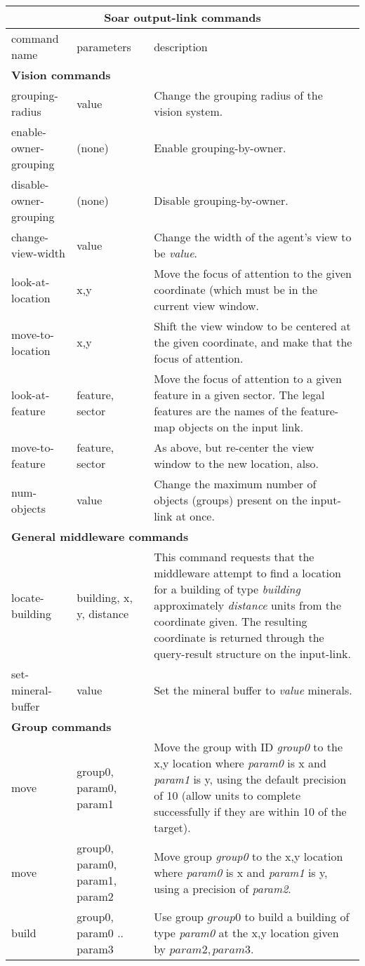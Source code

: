 \begin{center}
\begin{tabular}{|l|l|p{3.5in}|}
\hline
\multicolumn{3}{|c|}{\textbf{Soar output-link commands}}\\ 
\hline
command name &  parameters & description \\
\hline \hline
\multicolumn{3}{|l|}{\textbf{Vision commands}}\\ 
\hline
grouping-radius & value & Change the grouping radius of the vision system. \\
\hline
enable-owner-grouping & (none) & Enable grouping-by-owner.\\
\hline
disable-owner-grouping & (none) & Disable grouping-by-owner.\\
\hline
change-view-width & value & Change the width of the agent's view to be \textit{value}.\\
\hline 
look-at-location & x,y & Move the focus of attention to the given coordinate (which must be in the current view window.\\
\hline
move-to-location & x,y & Shift the view window to be centered at the given coordinate, and make that the focus of attention. \\
\hline
look-at-feature & feature, sector & Move the focus of attention to a given feature in a given sector. The legal features are the names of the feature-map objects on the input link.\\
\hline
move-to-feature & feature, sector & As above, but re-center the view window to the new location, also.\\
\hline
num-objects & value & Change the maximum number of objects (groups) present on the input-link at once.\\
\hline
\multicolumn{3}{|l|}{\textbf{General middleware commands}}\\ 
\hline
locate-building & building, x, y, distance & This command requests that the middleware attempt to find a location for a building of type \textit{building} approximately \textit{distance} units from the coordinate given. The resulting coordinate is returned through the query-result structure on the input-link. \\
\hline
set-mineral-buffer & value & Set the mineral buffer to \textit{value} minerals.\\
\hline
\multicolumn{3}{|l|}{\textbf{Group commands}}\\
\hline
move & group0, param0, param1 & Move the group with ID \textit{group0} to the x,y location where \textit{param0} is x and \textit{param1} is y, using the default precision of 10 (allow units to complete successfully if they are within 10 of the target).\\
\hline
move & group0, param0, param1, param2 & Move group \textit{group0} to the x,y location where \textit{param0} is x and \textit{param1} is y, using a precision of \textit{param2}.\\
\hline
build &group0, param0 .. param3 & Use group $group0$ to build a building of type \textit{param0} at the x,y location given by $param2, param3$.\\


\hline
\end{tabular}
\end{center}
